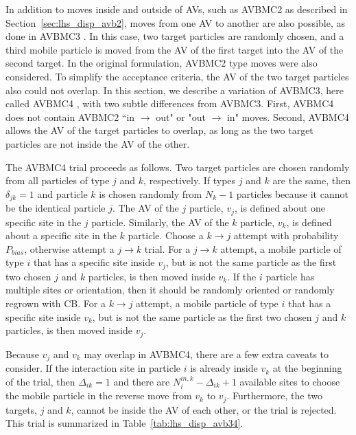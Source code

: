 In addition to moves inside and outside of AVs, such as AVBMC2 as described in Section~\ref{sec:lhs_disp_avb2}, moves from one AV to another are also possible, as done in AVBMC3 \cite{chen_improving_2001}.
In this case, two target particles are randomly chosen, and a third mobile particle is moved from the AV of the first target into the AV of the second target.
In the original formulation, AVBMC2 type moves were also considered.
To simplify the acceptance criteria, the AV of the two target particles also could not overlap.
In this section, we describe a variation of AVBMC3, here called AVBMC4 \cite{siderius_flat-histogram_2024}, with two subtle differences from AVBMC3.
First, AVBMC4 does not contain AVBMC2 ``in $\rightarrow$ out" or "out $\rightarrow$ in" moves.
Second, AVBMC4 allows the AV of the target particles to overlap, as long as the two target particles are not inside the AV of the other.

The AVBMC4 trial proceeds as follows.
Two target particles are chosen randomly from all particles of type $j$ and $k$, respectively.
If types $j$ and $k$ are the same, then $\delta_{jk}=1$ and particle $k$ is chosen randomly from $N_k-1$ particles because it cannot be the identical particle $j$.
The AV of the $j$ particle, $v_j$, is defined about one specific site in the $j$ particle.
Similarly, the AV of the $k$ particle, $v_k$, is defined about a specific site in the $k$ particle.
Choose a $k\rightarrow j$ attempt with probability $P_{bias}$, otherwise attempt a $j\rightarrow k$ trial.
For a $j\rightarrow k$ attempt, a mobile particle of type $i$ that has a specific site inside $v_j$, but is not the same particle as the first two chosen $j$ and $k$ particles, is then moved inside $v_k$.
If the $i$ particle has multiple sites or orientation, then it should be randomly oriented or randomly regrown with CB.
For a $k\rightarrow j$ attempt, a mobile particle of type $i$ that has a specific site inside $v_k$, but is not the same particle as the first two chosen $j$ and $k$ particles, is then moved inside $v_j$.

Because $v_j$ and $v_k$ may overlap in AVBMC4, there are a few extra caveats to consider.
If the interaction site in particle $i$ is already inside $v_k$ at the beginning of the trial, then $\Delta_{ik}=1$ and there are $N_i^{in,k} - \Delta_{ik} + 1$ available sites to choose the mobile particle in the reverse move from $v_k$ to $v_j$.
Furthermore, the two targets, $j$ and $k$, cannot be inside the AV of each other, or the trial is rejected.
This trial is summarized in Table~\ref{tab:lhs_disp_avb34}.

